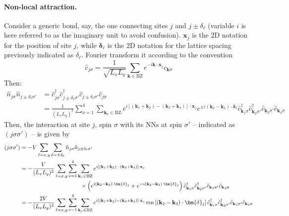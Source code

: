 \paragraph{Non-local attraction.} Consider a generic bond, say, the one connecting sites $j$ and $j\pm\delta_\ell$ (variable $i$ is here referred to as the imaginary unit to avoid confusion). $\mathbf{x}_j$ is the $2$D notation for the position of site $j$, while $\bm{\delta}_\ell$ is the $2$D notation for the lattice spacing previously indicated as $\delta_\ell$. Fourier transform it according to the convention
\[
	\hat c_{j\sigma} = \frac{1}{\sqrt{L_xL_y}} \sum_{\mathbf{k} \in \mathrm{BZ}} e^{-i \mathbf{k} \cdot \mathbf{x}_j} \hat c_{\mathbf{k}\sigma}
\]
Then:
\[
\begin{aligned}
	\hat n_{j\sigma} \hat n_{j \pm \delta_\ell \sigma'} &= \hat c_{j\sigma}^\dagger \hat c_{j \pm \delta_\ell \sigma'}^\dagger \hat c_{j \pm \delta_\ell \sigma'} \hat c_{j\sigma} \\
		&= \frac{1}{(L_xL_y)^2} \sum_{\nu=1}^4 \sum_{\mathbf{k}_\nu \in \mathrm{BZ}} e^{i \left[ (\mathbf{k}_1 + \mathbf{k}_2) - (\mathbf{k}_3 + \mathbf{k}_4) \right] \cdot \mathbf{x}_j} e^{\pm i(\mathbf{k}_2-\mathbf{k}_3) \cdot \bm{\delta}_\ell}  \hat c_{\mathbf{k}_1 \sigma}^\dagger \hat c_{\mathbf{k}_2 \sigma'}^\dagger \hat c_{\mathbf{k}_3 \sigma'} \hat c_{\mathbf{k}_4\sigma}
\end{aligned}
\]
Then, the interaction at site $j$, spin $\sigma$ with its NNs at spin $\sigma'$ -- indicated as $(j\sigma\sigma')$ -- is given by
\[
\begin{aligned}
	(j\sigma\sigma') &= -V \sum_{\ell = x,y} \sum_{\delta = \pm \delta_\ell} \hat n_{j\sigma} \hat n_{j \pm \delta_\ell \sigma'} \\
	&= -\frac{V}{(L_xL_y)^2} \sum_{\ell = x,y} \sum_{\nu=1}^4 \sum_{\mathbf{k}_\nu \in \mathrm{BZ}} e^{i \left[ (\mathbf{k}_1 + \mathbf{k}_2) - (\mathbf{k}_3 + \mathbf{k}_4) \right] \cdot \mathbf{x}_j} \\
	&\hspace{0.3\textwidth} \times \left(
	e^{ i(\mathbf{k}_2-\mathbf{k}_3) \cdot \bm{\delta}_\ell} + e^{ -i(\mathbf{k}_2-\mathbf{k}_3) \cdot \bm{\delta}_\ell} 
	\right)
	\hat c_{\mathbf{k}_1 \sigma}^\dagger \hat c_{\mathbf{k}_2 \sigma'}^\dagger \hat c_{\mathbf{k}_3 \sigma'} \hat c_{\mathbf{k}_4\sigma} \\
	&= -\frac{2V}{(L_xL_y)^2} \sum_{\ell = x,y} \sum_{\nu=1}^4 \sum_{\mathbf{k}_\nu \in \mathrm{BZ}} e^{i \left[ (\mathbf{k}_1 + \mathbf{k}_2) - (\mathbf{k}_3 + \mathbf{k}_4) \right] \cdot \mathbf{x}_j} \cos\left[
	(\mathbf{k}_2-\mathbf{k}_3) \cdot \bm{\delta}_\ell
	\right]	\hat c_{\mathbf{k}_1 \sigma}^\dagger \hat c_{\mathbf{k}_2 \sigma'}^\dagger \hat c_{\mathbf{k}_3 \sigma'} \hat c_{\mathbf{k}_4\sigma}
\end{aligned}
\]
